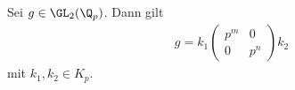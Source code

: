 \begin{prop}
Sei $g\in \GL_2(\Q_p)$. Dann gilt
\begin{align*}
g=k_1 \begin{pmatrix}
p^m&0\\
0&p^n
\end{pmatrix}k_2
\end{align*}
mit $k_1,k_2\in K_p$.
\end{prop}
